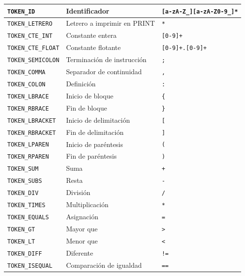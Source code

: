 \documentclass[12pt, letterpaper]{article}
\theoremstyle{definition}
\newcommand{\rx}[1]{\texttt{\textcolor{blue!70!black}{#1}}}
\begin{document}
\begin{center}
\begin{longtable}{|p{3.5cm}|p{5.5cm}|p{5cm}|}
    \texttt{TOKEN\_ID}         & Identificador                        & \rx{[a-zA-Z\_][a-zA-Z0-9\_]*} \\ \hline
    \texttt{TOKEN\_LETRERO}    & Letrero a imprimir en PRINT & \rx{\textquotedbl[\textasciicircum\textquotedbl]*\textquotedbl}\\ \hline    
    \texttt{TOKEN\_CTE\_INT}   & Constante entera                     & \rx{[0-9]+}       \\ \hline
    \texttt{TOKEN\_CTE\_FLOAT} & Constante flotante                   & \rx{[0-9]+.[0-9]+}\\ \hline
    \texttt{TOKEN\_SEMICOLON}  & Terminación de instrucción           & \rx{;}            \\ \hline
    \texttt{TOKEN\_COMMA}      & Separador de continuidad             & \rx{,}            \\ \hline
    \texttt{TOKEN\_COLON}      & Definición                           & \rx{:}            \\ \hline
    \texttt{TOKEN\_LBRACE}     & Inicio de bloque                     & \rx{\{}           \\ \hline
    \texttt{TOKEN\_RBRACE}     & Fin de bloque                        & \rx{\}}           \\ \hline
    \texttt{TOKEN\_LBRACKET}   & Inicio de delimitación               & \rx{[}            \\ \hline
    \texttt{TOKEN\_RBRACKET}   & Fin de delimitación                  & \rx{]}            \\ \hline
    \texttt{TOKEN\_LPAREN}     & Inicio de paréntesis                 & \rx{(}            \\ \hline
    \texttt{TOKEN\_RPAREN}     & Fin de paréntesis                    & \rx{)}            \\ \hline
    \texttt{TOKEN\_SUM}        & Suma                                 & \rx{+}            \\ \hline
    \texttt{TOKEN\_SUBS}      & Resta                                & \rx{-}            \\ \hline
    \texttt{TOKEN\_DIV}        & División                             & \rx{/}            \\ \hline
    \texttt{TOKEN\_TIMES}      & Multiplicación                       & \rx{*}            \\ \hline
    \texttt{TOKEN\_EQUALS}     & Asignación                           & \rx{=}            \\ \hline
    \texttt{TOKEN\_GT}         & Mayor que                            & \rx{\textgreater} \\ \hline
    \texttt{TOKEN\_LT}         & Menor que                            & \rx{\textless}    \\ \hline
    \texttt{TOKEN\_DIFF}       & Diferente                            & \rx{!=}           \\ \hline
    \texttt{TOKEN\_ISEQUAL}    & Comparación de igualdad              & \rx{==}           \\ \hline


\end{longtable}
\end{center}
\end{document}
